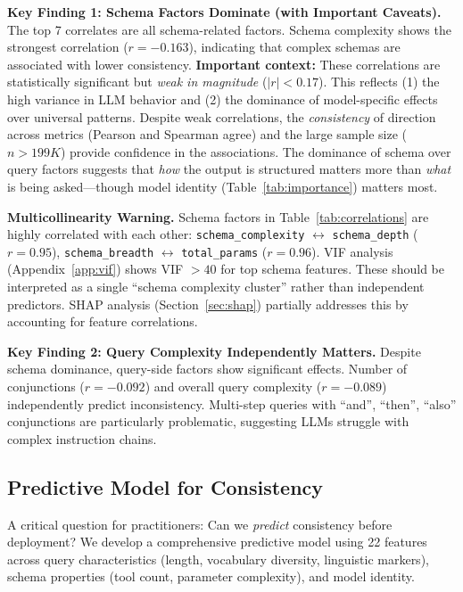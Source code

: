 \documentclass[sigconf,anonymous,review]{acmart}
\begin{document}
\textbf{Key Finding 1: Schema Factors Dominate (with Important Caveats).} The top 7 correlates are all schema-related factors. Schema complexity shows the strongest correlation ($r = -0.163$), indicating that complex schemas are associated with lower consistency. \textbf{Important context:} These correlations are statistically significant but \textit{weak in magnitude} ($|r| < 0.17$). This reflects (1) the high variance in LLM behavior and (2) the dominance of model-specific effects over universal patterns. Despite weak correlations, the \textit{consistency} of direction across metrics (Pearson and Spearman agree) and the large sample size ($n>199K$) provide confidence in the associations. The dominance of schema over query factors suggests that \textit{how} the output is structured matters more than \textit{what} is being asked---though model identity (Table~\ref{tab:importance}) matters most.

\textbf{Multicollinearity Warning.} Schema factors in Table~\ref{tab:correlations} are highly correlated with each other: \texttt{schema\_complexity} $\leftrightarrow$ \texttt{schema\_depth} ($r=0.95$), \texttt{schema\_breadth} $\leftrightarrow$ \texttt{total\_params} ($r=0.96$). VIF analysis (Appendix~\ref{app:vif}) shows VIF $>40$ for top schema features. These should be interpreted as a single ``schema complexity cluster'' rather than independent predictors. SHAP analysis (Section~\ref{sec:shap}) partially addresses this by accounting for feature correlations.

\textbf{Key Finding 2: Query Complexity Independently Matters.} Despite schema dominance, query-side factors show significant effects. Number of conjunctions ($r = -0.092$) and overall query complexity ($r = -0.089$) independently predict inconsistency. Multi-step queries with ``and'', ``then'', ``also'' conjunctions are particularly problematic, suggesting LLMs struggle with complex instruction chains.

\subsection{Predictive Model for Consistency}

A critical question for practitioners: Can we \textit{predict} consistency before deployment? We develop a comprehensive predictive model using 22 features across query characteristics (length, vocabulary diversity, linguistic markers), schema properties (tool count, parameter complexity), and model identity.
\end{document}
